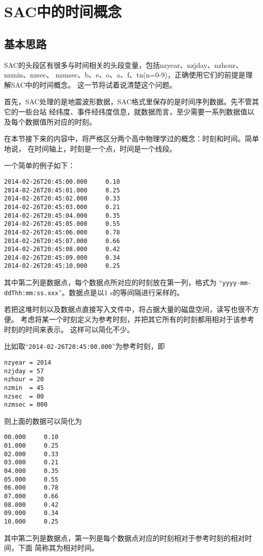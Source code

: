 \section{SAC中的时间概念}
\label{sec:sac-time}

\subsection{基本思路}
SAC的头段区有很多与时间相关的头段变量，包括nzyear、nzjday、nzhour、nzmin、nzsec、
nzmsec、b、e、o、a、f、tn(n=0-9)，正确使用它们的前提是理解SAC中的时间概念。
这一节将试着说清楚这个问题。

首先，SAC处理的是地震波形数据，SAC格式里保存的是时间序列数据。先不管其它的一些台站
经纬度、事件经纬度信息，就数据而言，至少需要一系列数据值以及每个数据值所对应的时刻。

在本节接下来的内容中，将严格区分两个高中物理学过的概念：时刻和时间。简单地说，
在时间轴上，时刻是一个点，时间是一个线段。

一个简单的例子如下：
\begin{verbatim}
2014-02-26T20:45:00.000     0.10
2014-02-26T20:45:01.000     0.25
2014-02-26T20:45:02.000     0.33
2014-02-26T20:45:03.000     0.21
2014-02-26T20:45:04.000     0.35
2014-02-26T20:45:05.000     0.55
2014-02-26T20:45:06.000     0.78
2014-02-26T20:45:07.000     0.66
2014-02-26T20:45:08.000     0.42
2014-02-26T20:45:09.000     0.34
2014-02-26T20:45:10.000     0.25
\end{verbatim}
其中第二列是数据点，每个数据点所对应的时刻放在第一列，格式为
``\verb+yyyy-mm-ddThh:mm:ss.xxx+''。数据点是以1 s的等间隔进行采样的。

若把这堆时刻以及数据点直接写入文件中，将占据大量的磁盘空间，读写也很不方便。
考虑将某一个时刻定义为参考时刻，并把其它所有的时刻都用相对于该参考时刻的时间来表示。
这样可以简化不少。

比如取``\verb+2014-02-26T20:45:00.000+''为参考时刻，即
\begin{verbatim}
nzyear = 2014
nzjday = 57
nzhour = 20
nzmin  = 45
nzsec  = 00
nzmsec = 000
\end{verbatim}
则上面的数据可以简化为
\begin{verbatim}
00.000     0.10
01.000     0.25
02.000     0.33
03.000     0.21
04.000     0.35
05.000     0.55
06.000     0.78
07.000     0.66
08.000     0.42
09.000     0.34
10.000     0.25
\end{verbatim}
其中第二列是数据点，第一列是每个数据点对应的时刻相对于参考时刻的相对时间，下面
简称其为相对时间。

